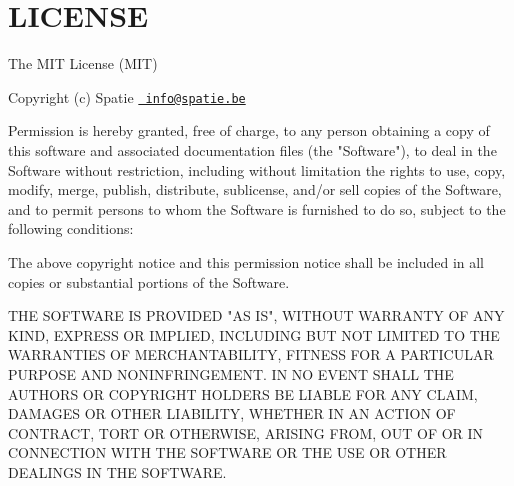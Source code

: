 \chapter{LICENSE}
\hypertarget{md_vendor_2spatie_2ignition_2_l_i_c_e_n_s_e}{}\label{md_vendor_2spatie_2ignition_2_l_i_c_e_n_s_e}
The MIT License (MIT)

Copyright (c) Spatie \href{mailto:info@spatie.be}{\texttt{ info@spatie.\+be}}

Permission is hereby granted, free of charge, to any person obtaining a copy of this software and associated documentation files (the "{}\+Software"{}), to deal in the Software without restriction, including without limitation the rights to use, copy, modify, merge, publish, distribute, sublicense, and/or sell copies of the Software, and to permit persons to whom the Software is furnished to do so, subject to the following conditions\+:

The above copyright notice and this permission notice shall be included in all copies or substantial portions of the Software.

THE SOFTWARE IS PROVIDED "{}\+AS IS"{}, WITHOUT WARRANTY OF ANY KIND, EXPRESS OR IMPLIED, INCLUDING BUT NOT LIMITED TO THE WARRANTIES OF MERCHANTABILITY, FITNESS FOR A PARTICULAR PURPOSE AND NONINFRINGEMENT. IN NO EVENT SHALL THE AUTHORS OR COPYRIGHT HOLDERS BE LIABLE FOR ANY CLAIM, DAMAGES OR OTHER LIABILITY, WHETHER IN AN ACTION OF CONTRACT, TORT OR OTHERWISE, ARISING FROM, OUT OF OR IN CONNECTION WITH THE SOFTWARE OR THE USE OR OTHER DEALINGS IN THE SOFTWARE. 